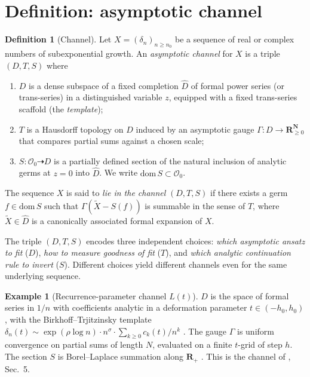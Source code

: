 \documentclass[11pt,reqno]{amsart}
\theoremstyle{plain}
\theoremstyle{definition}
\newtheorem{definition}[theorem]{Definition}
\newtheorem{example}[theorem]{Example}
\theoremstyle{remark}
\newcommand{\Lt}{L(t)}
\newcommand{\dn}{\delta_{n}}
\begin{document}
\section{Definition: asymptotic channel}
\label{sec:def}

\begin{definition}[Channel]\label{def:channel}
Let $X = (\dn)_{n \geq n_0}$ be a sequence of real or
complex numbers of subexponential growth. An
\emph{asymptotic channel} for $X$ is a triple $(D, T, S)$
where
\begin{enumerate}
\item $D$ is a dense subspace of a fixed completion
$\widehat{D}$ of formal power series (or trans-series)
in a distinguished variable $z$, equipped with a fixed
trans-series scaffold (the \emph{template});
\item $T$ is a Hausdorff topology on $D$ induced by an
asymptotic gauge $\Gamma : D \to \mathbf{R}_{\ge 0}^{\mathbf{N}}$
that compares partial sums against a chosen scale;
\item $S : \mathcal{O}_0 \dashrightarrow D$ is a partially
defined section of the natural inclusion of analytic
germs at $z=0$ into $\widehat{D}$. We write
$\mathrm{dom}\, S \subset \mathcal{O}_0$.
\end{enumerate}
The sequence $X$ is said to \emph{lie in the channel}
$(D,T,S)$ if there exists a germ $f \in \mathrm{dom}\, S$
such that $\Gamma(\widetilde X - S(f))$ is summable in the
sense of $T$, where $\widetilde X \in \widehat D$ is a
canonically associated formal expansion of $X$.
\end{definition}

The triple $(D,T,S)$ encodes three independent choices:
\emph{which asymptotic ansatz to fit} ($D$),
\emph{how to measure goodness of fit} ($T$), and
\emph{which analytic continuation rule to invert} ($S$).
Different choices yield different channels even for the same
underlying sequence.

\begin{example}[Recurrence-parameter channel $\Lt$]
\label{ex:lt}
$D$ is the space of formal series in $1/n$ with coefficients
analytic in a deformation parameter $t \in (-h_0, h_0)$, with
the Birkhoff--Trjitzinsky template
$\dn(t) \sim \exp(\rho \log n) \cdot n^\sigma \cdot
\sum_{k \ge 0} c_k(t)/n^k$
\cite{birkhofftrjitzinsky1932analytic, wimp1984computation}.
The gauge $\Gamma$ is uniform convergence on partial sums of
length $N$, evaluated on a finite $t$-grid of step $h$. The
section $S$ is Borel--Laplace summation along $\mathbf{R}_+$
\cite{costin2008asymptotics}. This is the channel of
\cite{siarc_pcf1_v13}, Sec.~5.
\end{example}
\end{document}
